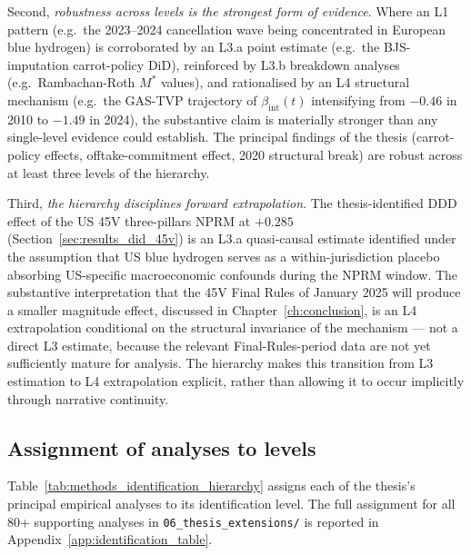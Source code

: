 Second, \emph{robustness across levels is the strongest form of evidence}. Where an L1 pattern (e.g.\ the 2023--2024 cancellation wave being concentrated in European blue hydrogen) is corroborated by an L3.a point estimate (e.g.\ the BJS-imputation carrot-policy DiD), reinforced by L3.b breakdown analyses (e.g.\ Rambachan-Roth $M^*$ values), and rationalised by an L4 structural mechanism (e.g.\ the GAS-TVP trajectory of $\beta_{\mathrm{int}}(t)$ intensifying from $-0.46$ in 2010 to $-1.49$ in 2024), the substantive claim is materially stronger than any single-level evidence could establish. The principal findings of the thesis (carrot-policy effects, offtake-commitment effect, 2020 structural break) are robust across at least three levels of the hierarchy.

Third, \emph{the hierarchy disciplines forward extrapolation}. The thesis-identified DDD effect of the US 45V three-pillars NPRM at $+0.285$ (Section~\ref{sec:results_did_45v}) is an L3.a quasi-causal estimate identified under the assumption that US blue hydrogen serves as a within-jurisdiction placebo absorbing US-specific macroeconomic confounds during the NPRM window. The substantive interpretation that the 45V Final Rules of January 2025 will produce a smaller magnitude effect, discussed in Chapter~\ref{ch:conclusion}, is an L4 extrapolation conditional on the structural invariance of the mechanism --- not a direct L3 estimate, because the relevant Final-Rules-period data are not yet sufficiently mature for analysis. The hierarchy makes this transition from L3 estimation to L4 extrapolation explicit, rather than allowing it to occur implicitly through narrative continuity.

\subsection{Assignment of analyses to levels}
\label{sec:methods_assignment}

Table~\ref{tab:methods_identification_hierarchy} assigns each of the thesis's principal empirical analyses to its identification level. The full assignment for all 80+ supporting analyses in \texttt{06\_thesis\_extensions/} is reported in Appendix~\ref{app:identification_table}.

